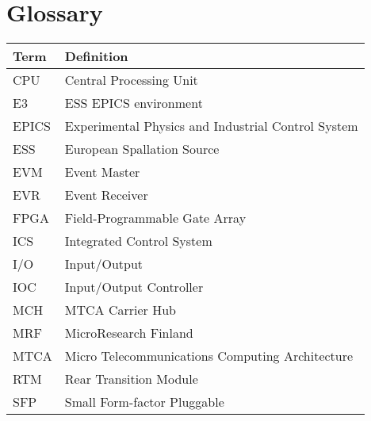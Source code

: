 \documentclass[11pt
  , a4paper
  , article
  , oneside
  , showtrims
]{memoir}
\begin{document}
{\chapter*{Glossary}\label{sec:glossary}
\begin{table}[!htb]
  \begin{tabular}{ll}
    \toprule
    \textbf{Term} & Definition                                          \\\midrule
    CPU           & Central Processing Unit                             \\
    E3            & ESS EPICS environment                               \\
    EPICS         & Experimental Physics and Industrial Control System  \\
    ESS           & European Spallation Source                          \\
    EVM           & Event Master                                        \\
    EVR           & Event Receiver                                      \\
    FPGA          & Field-Programmable Gate Array                       \\
    ICS           & Integrated Control System                           \\
    I/O           & Input/Output                                        \\
    IOC           & Input/Output Controller                             \\
    MCH           & MTCA Carrier Hub                                    \\
    MRF           & MicroResearch Finland                               \\
    MTCA          & Micro Telecommunications Computing Architecture     \\
    RTM           & Rear Transition Module                              \\
    SFP           & Small Form-factor Pluggable                         \\
    \bottomrule
  \end{tabular}
  \label{table:glossary}
\end{table}

}
\end{document}
